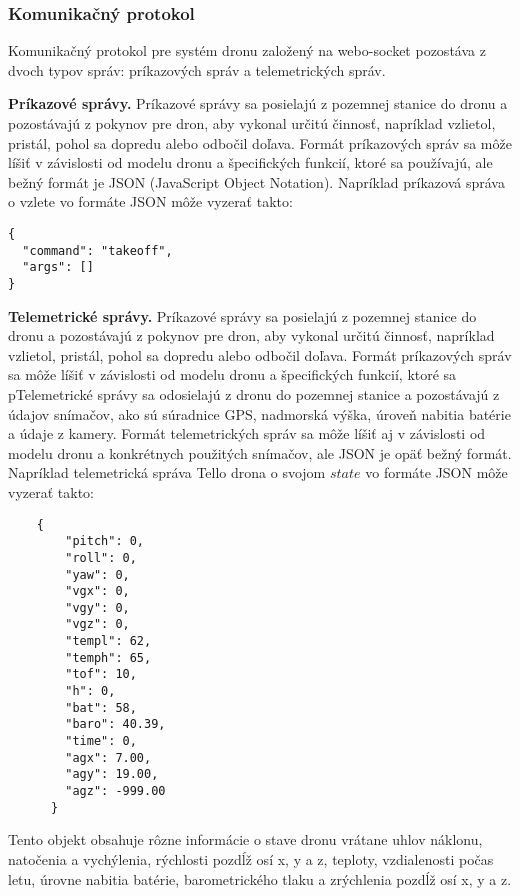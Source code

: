 {\subsubsection{Komunikačný protokol}
Komunikačný protokol pre systém dronu založený na webo-socket pozostáva z dvoch typov správ: príkazových správ a telemetrických správ.

\textbf{Príkazové správy.} Príkazové správy sa posielajú z pozemnej stanice do dronu a pozostávajú z pokynov pre dron, aby vykonal určitú činnosť, napríklad vzlietol, pristál, pohol sa dopredu alebo odbočil doľava. Formát príkazových správ sa môže líšiť v závislosti od modelu dronu a špecifických funkcií, ktoré sa používajú, ale bežný formát je JSON (JavaScript Object Notation). Napríklad príkazová správa o vzlete vo formáte JSON môže vyzerať takto:
\begin{verbatim}
{
  "command": "takeoff",
  "args": []
}
\end{verbatim}

\textbf{Telemetrické správy.} Príkazové správy sa posielajú z pozemnej stanice do dronu a pozostávajú z pokynov pre dron, aby vykonal určitú činnosť, napríklad vzlietol, pristál, pohol sa dopredu alebo odbočil doľava. Formát príkazových správ sa môže líšiť v závislosti od modelu dronu a špecifických funkcií, ktoré sa pTelemetrické správy sa odosielajú z dronu do pozemnej stanice a pozostávajú z údajov snímačov, ako sú súradnice GPS, nadmorská výška, úroveň nabitia batérie a údaje z kamery. Formát telemetrických správ sa môže líšiť aj v závislosti od modelu dronu a konkrétnych použitých snímačov, ale JSON je opäť bežný formát. Napríklad telemetrická správa Tello drona o svojom $state$ vo formáte JSON môže vyzerať takto:
\begin{verbatim}
    {
        "pitch": 0,
        "roll": 0,
        "yaw": 0,
        "vgx": 0,
        "vgy": 0,
        "vgz": 0,
        "templ": 62,
        "temph": 65,
        "tof": 10,
        "h": 0,
        "bat": 58,
        "baro": 40.39,
        "time": 0,
        "agx": 7.00,
        "agy": 19.00,
        "agz": -999.00
      }
\end{verbatim}
Tento objekt obsahuje rôzne informácie o stave dronu vrátane uhlov náklonu, natočenia a vychýlenia, rýchlosti pozdĺž osí x, y a z, teploty, vzdialenosti počas letu, úrovne nabitia batérie, barometrického tlaku a zrýchlenia pozdĺž osí x, y a z.

}
